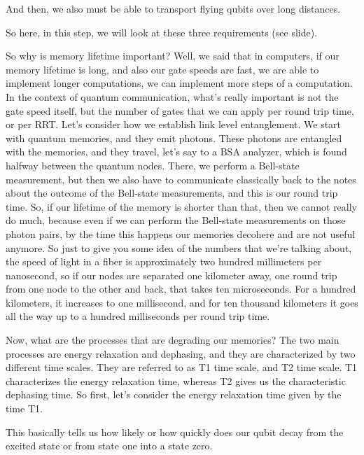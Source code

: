 And then, we also must be able to transport flying qubits over long distances.

So here, in this step, we will look at these three requirements (see slide).

So why is memory lifetime important? Well, we said that in computers, if our memory lifetime is long, and also our gate speeds are fast, we are able to implement longer computations, we can implement more steps of a computation. In the context of quantum communication, what's really important is not the gate speed itself, but the number of gates that we can apply per round trip time, or per RRT. Let's consider how we establish link level entanglement. We start with quantum memories, and they emit photons. These photons are entangled with the memories, and they travel, let's say to a BSA analyzer, which is found halfway between the quantum nodes. There, we perform a Bell-state measurement, but then we also have to communicate classically back to the notes about the outcome of the Bell-state measurements, and this is our round trip time. So, if our lifetime of the memory is shorter than that, then we cannot really do much, because even if we can perform the Bell-state measurements on those photon pairs, by the time this happens our memories decohere and are not useful anymore. So just to give you some idea of the numbers that we're talking about, the speed of light in a fiber is approximately two hundred millimeters per nanosecond, so if our nodes are separated one kilometer away, one round trip from one node to the other and back, that takes ten microseconds. For a hundred kilometers, it increases to one millisecond, and for ten thousand kilometers it goes all the way up to a hundred milliseconds per round trip time.

Now, what are the processes that are degrading our memories? The two main processes are energy relaxation and dephasing, and they are characterized by two different time scales. They are referred to as T1 time scale, and T2 time scale. T1 characterizes the energy relaxation time, whereas T2 gives us the characteristic dephasing time. So first, let's consider the energy relaxation time given by the time T1.

This basically tells us how likely or how quickly does our qubit decay from the excited state or from state one into a state zero.

